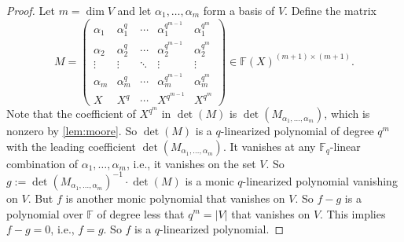 \documentclass[11pt]{article}
\newif\ifmynotes
\newcommand{\ZGnote}[1]{\ifmynotes\textcolor{purple}{[Zeyu: #1]}\else\fi}
\theoremstyle{plain}
\theoremstyle{definition}
\theoremstyle{remark}
\newcommand{\F}{\mathbb{F}}
\newcommand{\spa}{\mathrm{span}}
\begin{document}
\begin{proof} 
Let $m=\dim V$ and let $\alpha_1,\dots,\alpha_m$ form a basis of $V$. Define the matrix
\[
M=\begin{pmatrix}
\alpha_1 & \alpha_1^q & \cdots & \alpha_1^{q^{m-1}} & \alpha_1^{q^m}\\
\alpha_2 & \alpha_2^q & \cdots & \alpha_2^{q^{m-1}} & \alpha_2^{q^m}\\
\vdots & \vdots & \ddots & \vdots & \vdots\\
\alpha_m & \alpha_m^q & \cdots & \alpha_m^{q^{m-1}} & \alpha_m^{q^m}\\
X & X^q & \cdots & X^{q^{m-1}} & X^{q^m}
\end{pmatrix}\in  \F(X)^{(m+1)\times (m+1)}.
\]
Note that the coefficient of $X^{q^m}$ in $\det(M)$ is $\det(M_{\alpha_1,\dots,\alpha_m})$, which is nonzero by \cref{lem:moore}.
So $\det(M)$ is a $q$-linearized polynomial of degree $q^m$ with the leading coefficient $\det(M_{\alpha_1,\dots,\alpha_m})$. It vanishes at any $\F_q$-linear combination of $\alpha_1,\dots,\alpha_m$, i.e., it vanishes on the set $V$.
So $g:=\det(M_{\alpha_1,\dots,\alpha_m})^{-1} \cdot \det(M)$ is a monic $q$-linearized polynomial vanishing on $V$. But $f$ is another monic polynomial that vanishes on $V$. So $f-g$ is a polynomial over $\F$ of degree less that $q^m=|V|$ that vanishes on $V$. This implies $f-g=0$, i.e., $f=g$. So $f$ is a $q$-linearized polynomial.
\end{proof}
 
\end{document}
